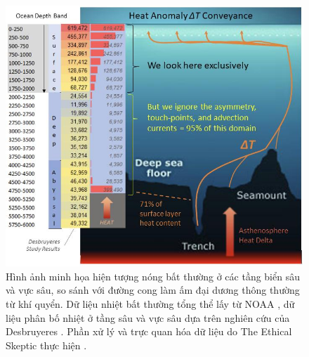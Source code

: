 \documentclass[10pt,twocolumn,letterpaper]{article}
\begin{document}
\begin{figure}[t]
\begin{center}
\includegraphics[width=1\textwidth]{deepsea.jpg}
\end{center}
   \caption{Hình ảnh minh họa hiện tượng nóng bất thường ở các tầng biển sâu và vực sâu, so sánh với đường cong làm ấm đại dương thông thường từ khí quyển. Dữ liệu nhiệt bất thường tổng thể lấy từ NOAA \cite{147}, dữ liệu phân bố nhiệt ở tầng sâu và vực sâu dựa trên nghiên cứu của Desbruyeres \cite{132}. Phần xử lý và trực quan hóa dữ liệu do The Ethical Skeptic thực hiện \cite{129}.}
\label{fig:21}
\end{figure}
\end{document}
